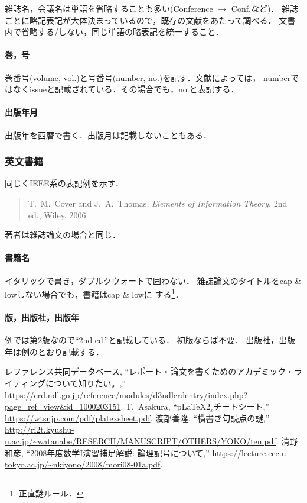 \documentclass[a4paper,10pt,twocolumn,dvipdfmx]{jsarticle}
\theoremstyle{definition}
\begin{document}
雑誌名，会議名は単語を省略することも多い(Conference $\to$ Conf.など)．
雑誌ごとに略記表記が大体決まっているので，既存の文献をあたって調べる．
文書内で省略する/しない，同じ単語の略表記を統一すること．

\paragraph{巻，号}
巻番号(volume, vol.)と号番号(number, no.)を記す．文献によっては，
numberではなくissueと記載されている．その場合でも，no.と表記する．

\paragraph{出版年月}
出版年を西暦で書く．出版月は記載しないこともある．

\subsubsection{英文書籍}\label{sec:ref-enb}
同じくIEEE系の表記例を示す．
\begin{quote}
 T.~M.~Cover and J.~A.~Thomas, 
 \emph{Elements of Information Theory}, 2nd ed., Wiley, 2006.
\end{quote}

著者は雑誌論文の場合と同じ．
\paragraph{書籍名}
イタリックで書き，ダブルクウォートで囲わない．
雑誌論文のタイトルをcap \& lowしない場合でも，書籍はcap \& lowに
する\footnote{正直謎ルール．}．

\paragraph{版，出版社，出版年}
例では第2版なので``2nd ed.''と記載している．
初版ならば不要．
出版社，出版年は例のとおり記載する．

\begin{thebibliography}{9}
        レファレンス共同データベース, 
        ``レポート・論文を書くためのアカデミック・ライティングについて知りたい。,''
        \url{https://crd.ndl.go.jp/reference/modules/d3ndlcrdentry/index.php?page=ref_view&id=1000203151}.
        T.~Asakura, ``p\LaTeX 2${}_\varepsilon$チートシート,''
        \url{https://wtsnjp.com/pdf/platexsheet.pdf}.
 渡部善隆, ``横書き句読点の謎,''
        \url{http://ri2t.kyushu-u.ac.jp/~watanabe/RESERCH/MANUSCRIPT/OTHERS/YOKO/ten.pdf}.
        清野和彦, ``2008年度数学I演習補足解説: 論理記号について,''
        \url{https://lecture.ecc.u-tokyo.ac.jp/~nkiyono/2008/mori08-01a.pdf}.
\end{thebibliography}
\end{document}
